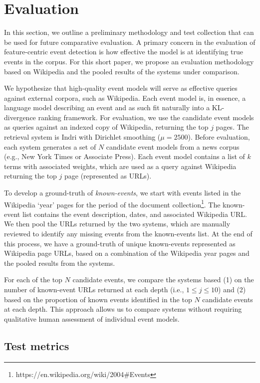 \documentclass{sig-alternate}
\begin{document}
\section{Evaluation}

In this section, we outline a preliminary methodology and test collection that can be used for future comparative evaluation. A primary concern in the evaluation of feature-centric event detection is how effective the model is at identifying true events in the corpus. For this short paper, we propose an evaluation methodology based on Wikipedia and the pooled results of the systems under comparison.

We hypothesize that high-quality event models will serve as effective queries against external corpora, such as Wikipedia. Each event model is, in essence, a language model describing an event and as such fit naturally into a KL-divergence ranking framework. For evaluation, we use the candidate event models as queries against an indexed copy of Wikipedia, returning the top $j$ pages. The retrieval system is Indri with Dirichlet smoothing ($\mu=2500$). 
Before evaluation, each system generates a set of $N$ candidate event models from a news corpus (e.g., New York Times or Associate Press). Each event model contains a list of $k$ terms with associated weights, which are used as a query against Wikipedia returning the top $j$ page (represented as URLs).

To develop a ground-truth of \emph{known-events}, we start with events listed in the Wikipedia `year' pages for the period of the document collection\footnote{https://en.wikipedia.org/wiki/2004\#Events}. The known-event list contains the event description, dates, and associated Wikipedia URL. We then pool the URLs returned by the two systems, which are manually reviewed to identify any missing events from the known-events list.  At the end of this process, we have a ground-truth of unique known-events represented as Wikipedia page URLs, based on a combination of the Wikipedia year pages and the pooled results from the systems.  

For each of the top $N$ candidate events, we compare the systems based (1) on the number of known-event URLs returned at each depth (i.e., $1 \le j \le 10$) and (2) based on the proportion of known events identified in the top $N$ candidate events at each depth.  This approach allows us to compare systems without requiring qualitative human assessment of individual event models.

\subsection{Test metrics}
\end{document}
